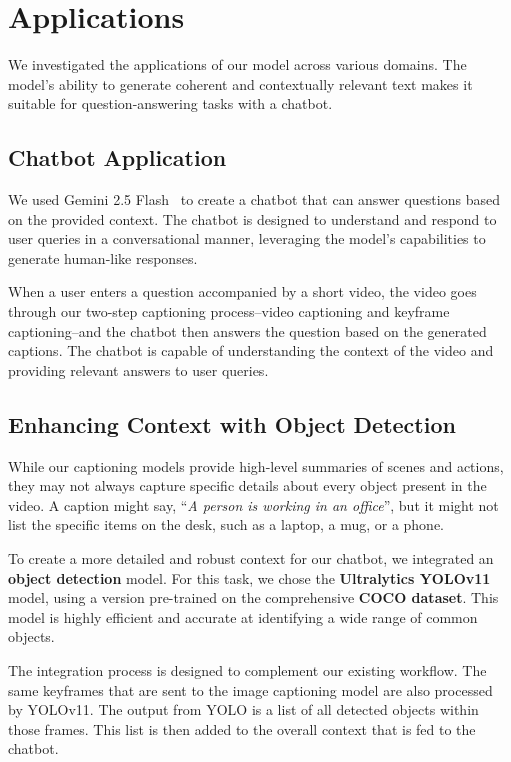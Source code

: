 \section{Applications}

We investigated the applications of our model across various domains. The model's ability to generate coherent and contextually relevant text makes it suitable for question-answering tasks with a chatbot.



\subsection{Chatbot Application}

We used Gemini 2.5 Flash~\cite{comanici2025gemini} to create a chatbot that can answer questions based on the provided context. The chatbot is designed to understand and respond to user queries in a conversational manner, leveraging the model's capabilities to generate human-like responses.

When a user enters a question accompanied by a short video, the video goes through our two-step captioning process--video captioning and keyframe captioning--and the chatbot then answers the question based on the generated captions. The chatbot is capable of understanding the context of the video and providing relevant answers to user queries.

\subsection{Enhancing Context with Object Detection}

While our captioning models provide high-level summaries of scenes and actions, they may not always capture specific details about every object present in the video. A caption might say, ``\textit{A person is working in an office}'', but it might not list the specific items on the desk, such as a laptop, a mug, or a phone.

To create a more detailed and robust context for our chatbot, we integrated an \textbf{object detection} model. For this task, we chose the \textbf{Ultralytics YOLOv11}~\cite{yolo11_ultralytics} model, using a version pre-trained on the comprehensive \textbf{COCO dataset}. This model is highly efficient and accurate at identifying a wide range of common objects.

The integration process is designed to complement our existing workflow. The same keyframes that are sent to the image captioning model are also processed by YOLOv11. The output from YOLO is a list of all detected objects within those frames. This list is then added to the overall context that is fed to the chatbot.

